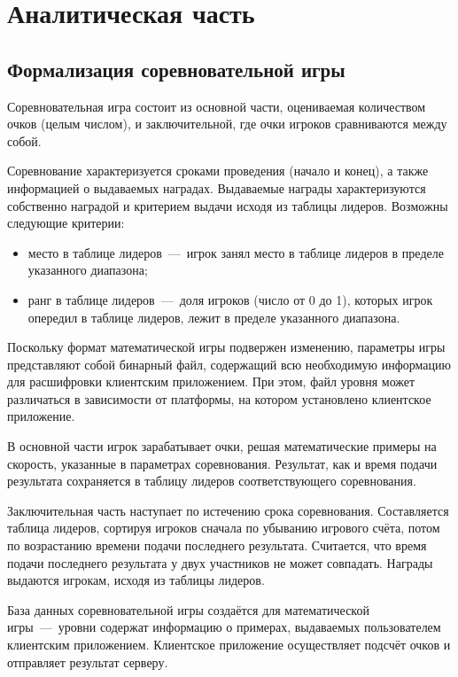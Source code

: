 \chapter{Аналитическая часть}

\section{Формализация соревновательной игры}

Соревновательная игра состоит из основной части, оцениваемая количеством очков (целым числом), и заключительной, где очки игроков сравниваются между собой.

Соревнование характеризуется сроками проведения (начало и конец), а также информацией о выдаваемых наградах. Выдаваемые награды характеризуются собственно наградой и критерием выдачи исходя из таблицы лидеров. Возможны следующие критерии:
\begin{itemize}
	\item место в таблице лидеров~---~игрок занял место в таблице лидеров в пределе указанного диапазона;
	\item ранг в таблице лидеров~---~доля игроков (число от 0 до 1), которых игрок опередил в таблице лидеров, лежит в пределе указанного диапазона.
\end{itemize}
Поскольку формат математической игры подвержен изменению, параметры игры представляют собой бинарный файл, содержащий всю необходимую информацию для расшифровки клиентским приложением. При этом, файл уровня может различаться в зависимости от платформы, на котором установлено клиентское приложение.



В основной части игрок зарабатывает очки, решая математические примеры на скорость, указанные в параметрах соревнования. Результат, как и время подачи результата сохраняется в таблицу лидеров соответствующего соревнования.

Заключительная часть наступает по истечению срока соревнования. Составляется таблица лидеров, сортируя игроков сначала по убыванию игрового счёта, потом по возрастанию времени подачи последнего результата. Считается, что время подачи последнего результата у двух участников не может совпадать. Награды выдаются игрокам, исходя из таблицы лидеров. 

База данных соревновательной игры создаётся для математической игры~---~уровни содержат информацию о примерах, выдаваемых пользователем клиентским приложением. Клиентское приложение осуществляет подсчёт очков и отправляет результат серверу.

